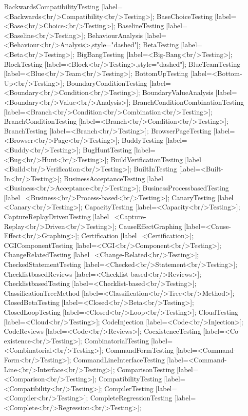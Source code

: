 \documentclass{article}
\begin{document}
{BackwardsCompatibilityTesting [label=<Backwards<br/>Compatibility<br/>Testing>];
BaseChoiceTesting [label=<Base<br/>Choice<br/>Testing>];
BaselineTesting [label=<Baseline<br/>Testing>];
BehaviourAnalysis [label=<Behaviour<br/>Analysis>,style="dashed"];
BetaTesting [label=<Beta<br/>Testing>];
BigBangTesting [label=<Big-Bang<br/>Testing>];
BlockTesting [label=<Block<br/>Testing>,style="dashed"];
BlueTeamTesting [label=<Blue<br/>Team<br/>Testing>];
BottomUpTesting [label=<Bottom-Up<br/>Testing>];
BoundaryConditionTesting [label=<Boundary<br/>Condition<br/>Testing>];
BoundaryValueAnalysis [label=<Boundary<br/>Value<br/>Analysis>];
BranchConditionCombinationTesting [label=<Branch<br/>Condition<br/>Combination<br/>Testing>];
BranchConditionTesting [label=<Branch<br/>Condition<br/>Testing>];
BranchTesting [label=<Branch<br/>Testing>];
BrowserPageTesting [label=<Browser<br/>Page<br/>Testing>];
BuddyTesting [label=<Buddy<br/>Testing>];
BugHuntTesting [label=<Bug<br/>Hunt<br/>Testing>];
BuildVerificationTesting [label=<Build<br/>Verification<br/>Testing>];
BuiltInTesting [label=<Built-In<br/>Testing>];
BusinessAcceptanceTesting [label=<Business<br/>Acceptance<br/>Testing>];
BusinessProcessbasedTesting [label=<Business<br/>Process-based<br/>Testing>];
CanaryTesting [label=<Canary<br/>Testing>];
CapacityTesting [label=<Capacity<br/>Testing>];
CaptureReplayDrivenTesting [label=<Capture-Replay<br/>Driven<br/>Testing>];
CauseEffectGraphing [label=<Cause-Effect<br/>Graphing>];
Certification [label=<Certification>];
CGIComponentTesting [label=<CGI<br/>Component<br/>Testing>];
ChangeRelatedTesting [label=<Change-Related<br/>Testing>];
CheckedStatementTesting [label=<Checked<br/>Statement<br/>Testing>];
ChecklistbasedReviews [label=<Checklist-based<br/>Reviews>];
ChecklistbasedTesting [label=<Checklist-based<br/>Testing>];
ClassificationTreeMethod [label=<Classification<br/>Tree<br/>Method>];
ClosedBetaTesting [label=<Closed<br/>Beta<br/>Testing>];
ClosedLoopTesting [label=<Closed<br/>Loop<br/>Testing>];
CloudTesting [label=<Cloud<br/>Testing>];
CodeInjection [label=<Code<br/>Injection>];
CodeReviews [label=<Code<br/>Reviews>];
CoexistenceTesting [label=<Co-existence<br/>Testing>];
CombinatorialTesting [label=<Combinatorial<br/>Testing>];
CommandFormTesting [label=<Command-Form<br/>Testing>];
CommandLineInterfaceTesting [label=<Command-Line<br/>Interface<br/>Testing>];
ComparisonTesting [label=<Comparison<br/>Testing>];
CompatibilityTesting [label=<Compatibility<br/>Testing>];
CompilerTesting [label=<Compiler<br/>Testing>];
CompleteRegressionTesting [label=<Complete<br/>Regression<br/>Testing>];
}
\end{document}
